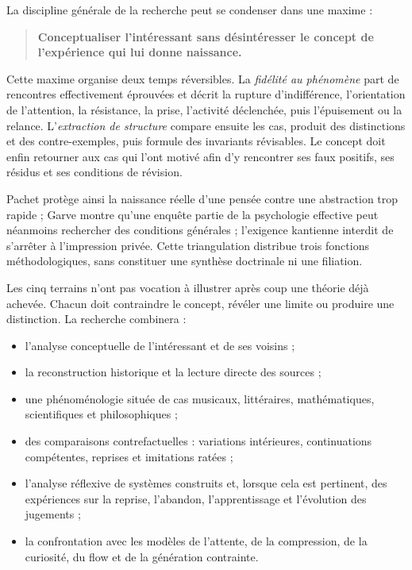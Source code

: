 \documentclass[11pt,a4paper]{article}
\begin{document}
La discipline générale de la recherche peut se condenser dans une maxime :

\begin{quote}
\textbf{Conceptualiser l'intéressant sans désintéresser le concept de
l'expérience qui lui donne naissance.}
\end{quote}

Cette maxime organise deux temps réversibles. La \emph{fidélité au phénomène}
part de rencontres effectivement éprouvées et décrit la rupture d'indifférence,
l'orientation de l'attention, la résistance, la prise, l'activité déclenchée,
puis l'épuisement ou la relance. L'\emph{extraction de structure} compare ensuite
les cas, produit des distinctions et des contre-exemples, puis formule des
invariants révisables. Le concept doit enfin retourner aux cas qui l'ont motivé
afin d'y rencontrer ses faux positifs, ses résidus et ses conditions de révision.

Pachet protège ainsi la naissance réelle d'une pensée contre une abstraction trop
rapide ; Garve montre qu'une enquête partie de la psychologie effective peut
néanmoins rechercher des conditions générales ; l'exigence kantienne interdit de
s'arrêter à l'impression privée. Cette triangulation distribue trois fonctions
méthodologiques, sans constituer une synthèse doctrinale ni une filiation.

Les cinq terrains n'ont pas vocation à illustrer après coup une théorie déjà
achevée. Chacun doit contraindre le concept, révéler une limite ou produire une
distinction. La recherche combinera :

\begin{itemize}
  \item l'analyse conceptuelle de l'intéressant et de ses voisins ;
  \item la reconstruction historique et la lecture directe des sources ;
  \item une phénoménologie située de cas musicaux, littéraires, mathématiques,
        scientifiques et philosophiques ;
  \item des comparaisons contrefactuelles : variations intérieures,
        continuations compétentes, reprises et imitations ratées ;
  \item l'analyse réflexive de systèmes construits et, lorsque cela est
        pertinent, des expériences sur la reprise, l'abandon, l'apprentissage
        et l'évolution des jugements ;
  \item la confrontation avec les modèles de l'attente, de la compression, de
        la curiosité, du flow et de la génération contrainte.
\end{itemize}
\end{document}
